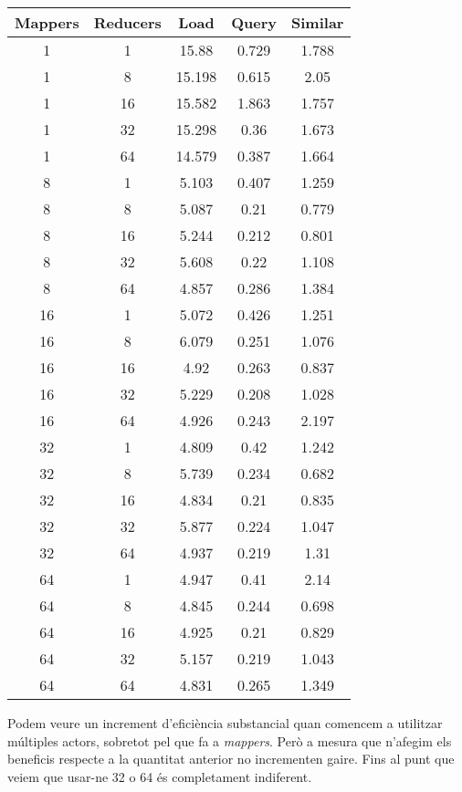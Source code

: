 \documentclass{article}
\begin{document}
\begin{table}[ht]
	\centering
	\begin{tabular}{|c|c|c|c|c|}
		\hline
		\textbf{Mappers} & \textbf{Reducers} & \textbf{Load} & \textbf{Query} & \textbf{Similar} \\
		\hline
		1 & 1 & 15.88 & 0.729 & 1.788 \\
		1 & 8 & 15.198 & 0.615 & 2.05 \\
		1 & 16 & 15.582 & 1.863 & 1.757 \\
		1 & 32 & 15.298 & 0.36 & 1.673 \\
		1 & 64 & 14.579 & 0.387 & 1.664 \\
		8 & 1 & 5.103 & 0.407 & 1.259 \\
		8 & 8 & 5.087 & 0.21 & 0.779 \\
		8 & 16 & 5.244 & 0.212 & 0.801 \\
		8 & 32 & 5.608 & 0.22 & 1.108 \\
		8 & 64 & 4.857 & 0.286 & 1.384 \\
		16 & 1 & 5.072 & 0.426 & 1.251 \\
		16 & 8 & 6.079 & 0.251 & 1.076 \\
		16 & 16 & 4.92 & 0.263 & 0.837 \\
		16 & 32 & 5.229 & 0.208 & 1.028 \\
		16 & 64 & 4.926 & 0.243 & 2.197 \\
		32 & 1 & 4.809 & 0.42 & 1.242 \\
		32 & 8 & 5.739 & 0.234 & 0.682 \\
		32 & 16 & 4.834 & 0.21 & 0.835 \\
		32 & 32 & 5.877 & 0.224 & 1.047 \\
		32 & 64 & 4.937 & 0.219 & 1.31 \\
		64 & 1 & 4.947 & 0.41 & 2.14 \\
		64 & 8 & 4.845 & 0.244 & 0.698 \\
		64 & 16 & 4.925 & 0.21 & 0.829 \\
		64 & 32 & 5.157 & 0.219 & 1.043 \\
		64 & 64 & 4.831 & 0.265 & 1.349 \\
		\hline
	\end{tabular}
\end{table}

Podem veure un increment d'eficiència substancial quan comencem a utilitzar
múltiples actors, sobretot pel que fa a \emph{mappers}. Però a mesura que
n'afegim els beneficis respecte a la quantitat anterior no incrementen gaire.
Fins al punt que veiem que usar-ne 32 o 64 és completament indiferent.
\end{document}
